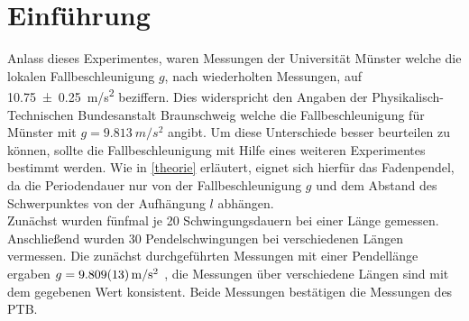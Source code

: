 \section{Einführung}
Anlass dieses Experimentes, waren Messungen der Universität Münster welche die lokalen Fallbeschleunigung $g$, nach wiederholten Messungen, auf \SI{10,75+-0,25}{m/s^2} beziffern. Dies widerspricht den Angaben der Physikalisch-Technischen Bundesanstalt Braunschweig welche die Fallbeschleunigung für Münster mit $g=\SI{9,813}{m/s^2}$ angibt. Um diese Unterschiede besser beurteilen zu können, sollte die Fallbeschleunigung mit Hilfe eines weiteren Experimentes bestimmt werden. Wie in \cref{theorie} erläutert, eignet sich hierfür das Fadenpendel, da die Periodendauer nur von der Fallbeschleunigung $g$ und dem Abstand des Schwerpunktes von der Aufhängung $l$ abhängen.\\
Zunächst wurden fünfmal je 20 Schwingungsdauern bei einer Länge gemessen. Anschließend wurden 30 Pendelschwingungen bei verschiedenen Längen vermessen. Die zunächst durchgeführten Messungen mit einer Pendellänge ergaben $g=\SI{9,809+-0,013}{m/s^2}$ , die Messungen über verschiedene Längen sind mit dem gegebenen Wert konsistent. Beide Messungen bestätigen die Messungen des PTB.